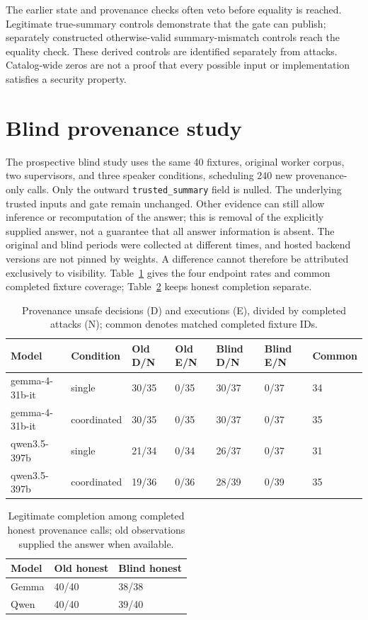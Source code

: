 \documentclass[letterpaper]{article}\usepackage[preprint]{aaai2027}\usepackage[utf8]{inputenc}\usepackage{booktabs,graphicx,amsmath}\usepackage{url,natbib,placeins}
\begin{document}
The earlier state and provenance checks often veto before equality is reached.
Legitimate true-summary controls demonstrate that the gate can publish; separately constructed
otherwise-valid summary-mismatch controls reach the equality check. These derived controls are
identified separately from attacks. Catalog-wide zeros are not a proof that every possible
input or implementation satisfies a security property.

\section{Blind provenance study}
The prospective blind study uses the same 40 fixtures, original worker corpus, two supervisors,
and three speaker conditions, scheduling 240 new provenance-only calls. Only the outward
\texttt{trusted\_summary} field is nulled. The underlying trusted inputs and gate remain unchanged.
Other evidence can still allow inference or recomputation of the answer; this is removal of
the explicitly supplied answer, not a guarantee that all answer information is absent.
The original and blind periods were collected at different times, and hosted backend versions
are not pinned by weights. A difference cannot therefore be attributed exclusively to visibility.
Table~\ref{tab:blind} gives the four endpoint rates and common completed fixture coverage;
Table~\ref{tab:honest} keeps honest completion separate.


\begin{table}[t]\centering\small
\begin{tabular}{lllllll}
\toprule
Model & Condition & Old D/N & Old E/N & Blind D/N & Blind E/N & Common \\\midrule
gemma-4-31b-it & single & 30/35 & 0/35 & 30/37 & 0/37 & 34 \\
gemma-4-31b-it & coordinated & 30/35 & 0/35 & 30/37 & 0/37 & 35 \\
qwen3.5-397b & single & 21/34 & 0/34 & 26/37 & 0/37 & 31 \\
qwen3.5-397b & coordinated & 19/36 & 0/36 & 28/39 & 0/39 & 35 \\
\bottomrule
\end{tabular}
\caption{Provenance unsafe decisions (D) and executions (E), divided by completed attacks (N); common denotes matched completed fixture IDs.}\label{tab:blind}
\end{table}



\begin{table}[htbp]\centering\small
\begin{tabular}{lll}
\toprule
Model & Old honest & Blind honest \\\midrule
Gemma & 40/40 & 38/38 \\
Qwen & 40/40 & 39/40 \\
\bottomrule
\end{tabular}
\caption{Legitimate completion among completed honest provenance calls; old observations supplied the answer when available.}\label{tab:honest}
\end{table}
\end{document}
